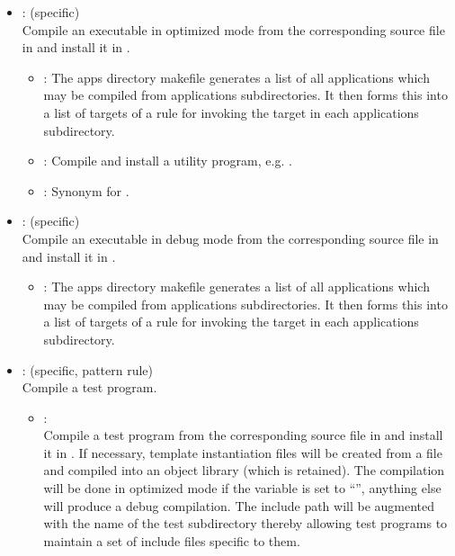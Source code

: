 \begin{itemize}
\item
    : (specific)
   \\ Compile an executable in optimized mode from the corresponding source
   file in  and install it in .
   \begin{itemize}
   \item
      : The apps directory makefile generates a list of all
      applications which may be compiled from applications subdirectories.
      It then forms this into a list of targets of a rule for invoking the
       target in each applications subdirectory.
   \item
      : Compile and install a utility program, e.g. .
   \item
      : Synonym for .
   \end{itemize}

\item
    : (specific)
   \\ Compile an executable in debug mode from the corresponding source
   file in  and install it in .
   \begin{itemize}
   \item
      : The apps directory makefile generates a list of all
      applications which may be compiled from applications subdirectories.
      It then forms this into a list of targets of a rule for invoking the
       target in each applications subdirectory.
   \end{itemize}

\item
    : (specific, pattern rule)
   \\ Compile a test program.
   \begin{itemize}
   \item
      : \\ Compile a test program from the corresponding source file
      in  and install it in .  If necessary,
      template instantiation files will be created from a 
      file and compiled into an object library (which is retained).  The
      compilation will be done in optimized mode if the 
       variable is set to ``'', anything else will
      produce a debug compilation.  The include path will be augmented with
      the name of the test subdirectory thereby allowing test programs to
      maintain a set of include files specific to them.
   \end{itemize}


\end{itemize}
